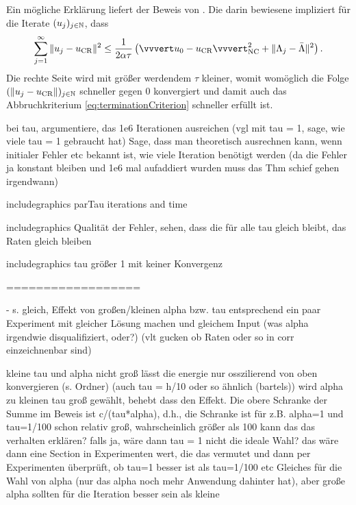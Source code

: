 Ein mögliche Erklärung liefert der Beweis von .
Die darin bewiesene  impliziert für die
Iterate $(u_j)_{j\in\mathbb{N}}$, dass
\begin{align*}
  \sum_{j=1}^\infty\Vert u_j-\ucr\Vert^2 
  \leq
  \frac{1}{2\alpha\tau}\left(\vvvert u_0-\ucr\vvvert^2_\nc + \Vert \Lambda_j
  -\bar\Lambda\Vert^2\right). %
\end{align*}
Die rechte Seite wird mit größer werdendem $\tau$ kleiner, womit womöglich
die Folge $(\left\Vert u_j-u_\textup{CR}\right\Vert)_{j\in\mathbb{N}}$ schneller gegen $0$
konvergiert und damit auch das Abbruchkriterium \eqref{eq:terminationCriterion}
schneller erfüllt ist. 

bei tau, argumentiere, das 1e6 Iterationen ausreichen (vgl mit tau = 1, sage, 
wie viele tau = 1 gebraucht hat) Sage, dass man theoretisch ausrechnen kann,
wenn initialer Fehler etc bekannt ist, wie viele Iteration benötigt werden (da 
die Fehler ja konstant bleiben und 1e6 mal aufaddiert wurden muss das 
Thm schief gehen irgendwann)

includegraphics parTau iterations and time

includegraphics Qualität der Fehler, sehen, dass die für alle tau gleich bleibt,
das Raten gleich bleiben

includegraphics tau größer 1 mit keiner Konvergenz 

==================

  - s. gleich, Effekt von großen/kleinen alpha bzw. tau entsprechend ein
    paar Experiment mit gleicher Lösung machen und gleichem Input (was alpha
    irgendwie disqualifiziert, oder?) (vlt gucken ob Raten oder so in corr
    einzeichnenbar sind)

kleine tau und alpha nicht groß lässt die energie nur osszilierend von oben
konvergieren (s. Ordner) (auch tau = h/10 oder so ähnlich (bartels))
wird alpha zu kleinen tau groß gewählt, behebt dass den Effekt.
Die obere Schranke der Summe im Beweis ist c/(tau*alpha), d.h., die Schranke
ist für z.B. alpha=1 und tau=1/100 schon relativ groß, wahrscheinlich größer
als 100
kann das das verhalten erklären?
falls ja, wäre dann tau = 1 nicht die ideale Wahl?
das wäre dann eine Section in Experimenten wert, die das vermutet und dann per
Experimenten überprüft, ob tau=1 besser ist als tau=1/100 etc
Gleiches für die Wahl von alpha (nur das alpha noch mehr Anwendung dahinter hat),
aber große alpha sollten für die Iteration besser sein als kleine 

